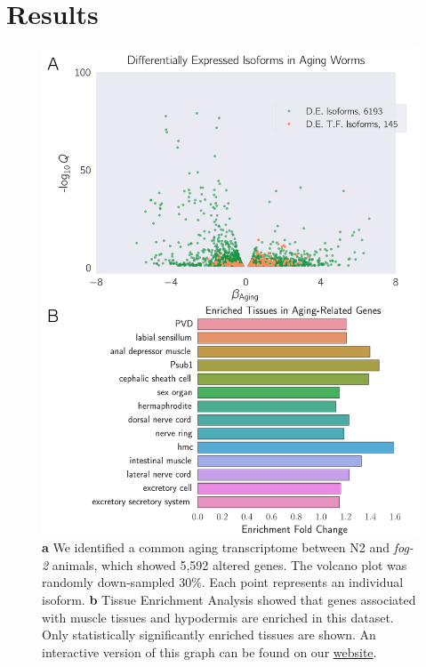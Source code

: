 \documentclass[10pt,letterpaper,twocolumn]{article}
\newcommand{\fog}{\emph{fog-2}}
\newcommand{\agen}{5,592}
\newcommand{\webref}{
\href{https://wormlabcaltech.github.io/Angeles_Leighton_2016/}{website}}
\begin{document}
\section*{Results}
\label{sec:results}
\begin{figure}[htbp]
\renewcommand{\familydefault}{\sfdefault}\normalfont{}
\centering
\includegraphics[width=\linewidth]{../output/figs/final_figs/aging_transcriptomics.pdf}
\caption{\textbf{ a} We identified a common aging transcriptome between N2 and \fog{} animals, which showed \agen{}  altered genes. The volcano plot was randomly down-sampled 30\%. Each point represents an individual isoform. \textbf{b} Tissue Enrichment Analysis showed that genes associated with muscle tissues and hypodermis are enriched in this dataset. Only statistically significantly enriched tissues are shown. An interactive version of this graph can be found on our \webref{}.
}
\label{fig:agingtranscriptome}
\end{figure}
\end{document}
